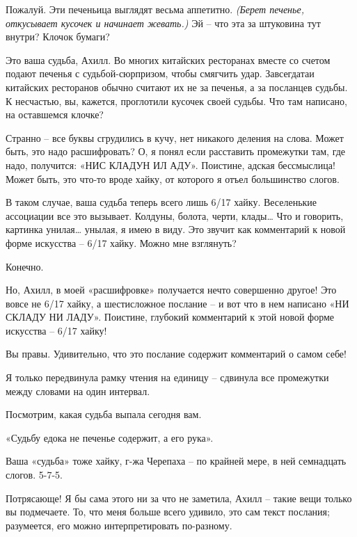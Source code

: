 \documentclass[../main.tex]{subfiles}
\begin{document}
\begin{Dialogue}
 Пожалуй. Эти печеньица выглядят весьма аппетитно. \emph{(Берет печенье, откусывает кусочек и начинает жевать.)} Эй \--- что эта за штуковина тут внутри? Клочок бумаги?

 Это ваша судьба, Ахилл. Во многих китайских ресторанах вместе со счетом подают печенья с судьбой-сюрпризом, чтобы смягчить удар. Завсегдатаи китайских ресторанов обычно считают их не за печенья, а за посланцев судьбы. К несчастью, вы, кажется, проглотили кусочек своей судьбы. Что там написано, на оставшемся клочке?

 Странно \--- все буквы сгрудились в кучу, нет никакого деления на слова. Может быть, это надо расшифровать? О, я понял если расставить промежутки там, где надо, получится: «НИС КЛАДУН ИЛ АДУ». Поистине, адская бессмыслица! Может быть, это что-то вроде хайку, от которого я отъел большинство слогов.

 В таком случае, ваша судьба теперь всего лишь 6/17 хайку. Веселенькие ассоциации все это вызывает. Колдуны, болота, черти, клады\ldots{} Что и говорить, картинка унилая\ldots{} унылая, я имею в виду. Это звучит как комментарий к новой форме искусства \--- 6/17 хайку. Можно мне взглянуть?

 Конечно.

 Но, Ахилл, в моей «расшифровке» получается нечто совершенно другое! Это вовсе не 6/17 хайку, а шестисложное послание \--- и вот что в нем написано «НИ СКЛАДУ НИ ЛАДУ». Поистине, глубокий комментарий к этой новой форме искусства \--- 6/17 хайку!

 Вы правы. Удивительно, что это послание содержит комментарий о самом себе!

 Я только передвинула рамку чтения на единицу \--- сдвинула все промежутки между словами на один интервал.

 Посмотрим, какая судьба выпала сегодня вам.

 «Судьбу едока не печенье содержит, а его рука».

 Ваша «судьба» тоже хайку, г-жа Черепаха \--- по крайней мере, в ней семнадцать слогов. 5-7-5.

 Потрясающе! Я бы сама этого ни за что не заметила, Ахилл \--- такие вещи только вы подмечаете. То, что меня больше всего удивило, это сам текст послания; разумеется, его можно интерпретировать по-разному.


\end{Dialogue}
\end{document}
